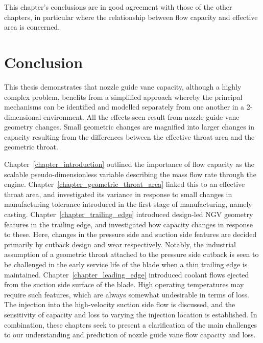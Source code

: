 \documentclass[a4paper, 11pt, oneside]{report}
\begin{document}
This chapter's conclusions are in good agreement with those of the other chapters, in particular where the relationship between flow capacity and effective area is concerned. 



\chapter{Conclusion}


This thesis demonstrates that nozzle guide vane capacity, although a highly complex problem, benefits from a simplified approach whereby the principal mechanisms can be identified and modelled separately from one another in a 2-dimensional environment. All the effects seen result from nozzle guide vane geometry changes. Small geometric changes are magnified into larger changes in capacity resulting from the differences between the effective throat area and the geometric throat.

Chapter~\ref{chapter_introduction} outlined the importance of flow capacity as the scalable pseudo-dimensionless variable describing the mass flow rate through the engine. Chapter~\ref{chapter_geometric_throat_area} linked this to an effective throat area, and investigated its variance in response to small changes in manufacturing tolerance introduced in the first stage of manufacturing, namely casting. Chapter~\ref{chapter_trailing_edge} introduced design-led NGV geometry features in the trailing edge, and investigated how capacity changes in response to these. Here, changes in the pressure side and suction side features are decided primarily by cutback design and wear respectively. Notably, the industrial assumption of a geometric throat attached to the pressure side cutback is seen to be challenged in the early service life of the blade when a thin trailing edge is maintained.  Chapter~\ref{chapter_leading_edge} introduced coolant flows ejected from the suction side surface of the blade.  High operating temperatures may require such features, which are always somewhat undesirable in terms of loss. The injection into the high-velocity suction side flow is discussed, and the sensitivity of capacity and loss to varying the injection location is established. In combination, these chapters seek to present a clarification of the main challenges to our understanding and prediction of nozzle guide vane flow capacity and loss.
\end{document}
